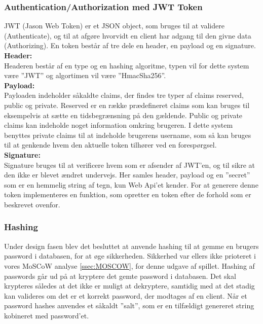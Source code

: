 \subsubsection{Authentication/Authorization med JWT Token}
JWT (Jason Web Token) er et JSON object, som bruges til at validere (Authenticate), og til at afgøre hvorvidt en client har adgang til den givne data (Authorizing). En token består af tre dele en header, en payload og en signature.\\

\textbf{Header:}\\
Headeren består af en type og en hashing algoritme, typen vil for dette system være ”JWT” og algortimen vil være ”HmacSha256”.\\

\textbf{Payload:}\\

Payloaden indeholder såkaldte claims, der findes tre typer af claims reserved, public og private. Reserved er en række prædefineret claims som kan bruges til eksempelvis at sætte en tidsbegrænsning på den gældende. Public og private claims kan indeholde noget information omkring brugeren. I dette system benyttes private claims til at indeholde brugerens username, som så kan bruges til at genkende hvem den aktuelle token tilhører ved en forespørgsel.\\

\textbf{Signature:}\\
Signature bruges til at verificere hvem som er afsender af JWT’en, og til sikre at den ikke er blevet ændret undervejs. Her samles header, payload og en ”secret” som er en hemmelig string af tegn, kun Web Api'et kender.
For at generere denne token implementeres en funktion, som opretter en token efter de forhold som er beskrevet ovenfor.\\


\subsubsection{Hashing}
\label{sssec: Hashing}
Under design fasen blev det besluttet at anvende hashing til at gemme en brugers password i databasen, for at øge sikkerheden. Sikkerhed var ellers ikke prioteret i vores MoSCoW analyse \autoref{ssec:MOSCOW}, for denne udgave af spillet.
Hashing af passwords går ud på at kryptere det gemte password i databasen. Det skal krypteres således at det ikke er muligt at dekryptere, samtidig med at det stadig kan valideres om det er et korrekt password, der modtages af en client. Når et password hashes anvendes et såkaldt ”salt”, som er en tilfældigt genereret string kobineret med password’et.\\

